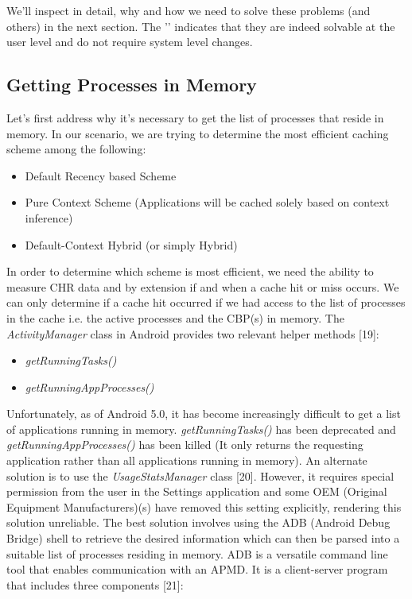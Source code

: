 \documentclass[12pt]{uthesis-v12}  %
\begin{document}
			We'll inspect in detail, why and how we need to solve these problems (and others) in the next section. The  '\checkmark' indicates that they are indeed solvable at the user level and do not require system level changes.
			
		\subsection{Getting Processes in Memory}
			Let's first address why it's necessary to get the list of processes that reside in memory. In our scenario, we are trying to determine the most efficient caching scheme among the following:
			
			\begin{itemize}
				\item Default Recency based Scheme
				\item Pure Context Scheme (Applications will be cached solely based on context inference)
				\item Default-Context Hybrid (or simply Hybrid)
			\end{itemize}
			
			In order to determine which scheme is most efficient, we need the ability to measure CHR data and by extension if and when a cache hit or miss occurs. We can only determine if a cache hit occurred if we had access to the list of processes in the cache i.e. the active processes and the CBP(s) in memory. The {\em ActivityManager} class in Android provides two relevant helper methods [19]:
			
			\begin{itemize}
				\item {\em getRunningTasks()}
				\item {\em getRunningAppProcesses()}
			\end{itemize} 
			
			Unfortunately, as of Android 5.0, it has become increasingly difficult to get a list of applications running in memory. {\em getRunningTasks()} has been deprecated and {\em getRunningAppProcesses()} has been killed (It only returns the requesting application rather than all applications running in memory). An alternate solution is to use the {\em UsageStatsManager} class [20]. However, it requires special permission from the user in the Settings application and some OEM (Original Equipment Manufacturers)(s) have removed this setting explicitly, rendering this solution unreliable. The best solution involves using the ADB (Android Debug Bridge) shell to retrieve the desired information which can then be parsed into a suitable list of processes residing in memory. ADB is a versatile command line tool that enables communication with an APMD. It is a client-server program that includes three components [21]:
			
\end{document}
